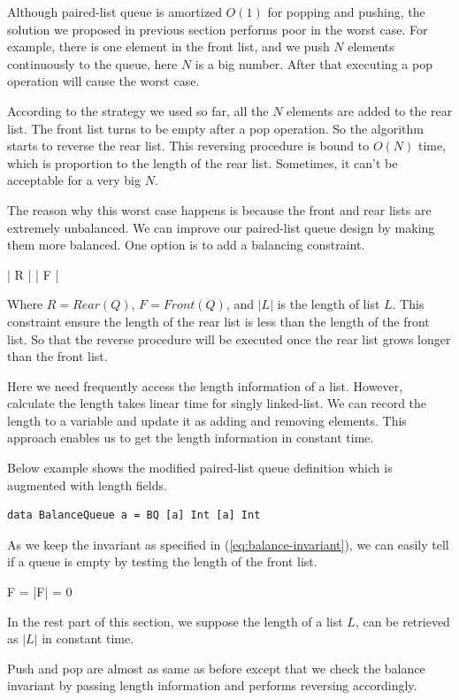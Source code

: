 \documentclass[UTF8]{article}
\begin{document}
Although paired-list queue is amortized $O(1)$ for popping and pushing,
the solution we proposed in previous section performs poor in the worst case.
For example, there is one element in the front list, and we push $N$ elements
continuously to the queue, here $N$ is a big number. After that executing
a pop operation will cause the worst case.

According to the strategy we used so far, all the $N$ elements are added
to the rear list. The front list turns to be empty after a pop operation.
So the algorithm starts to reverse the rear list. This reversing procedure
is bound to $O(N)$ time, which is proportion to the length of the rear
list. Sometimes, it can't be
acceptable for a very big $N$.

The reason why this worst case happens is because the front and rear lists
are extremely unbalanced. We can improve our paired-list queue design
by making them more balanced. One option is to add a balancing constraint.

\be
  | R | \leq | F |
\label{eq:balance-invariant}
\ee

Where $R = Rear(Q)$, $F = Front(Q)$, and $|L|$ is the length of list $L$.
This constraint ensure the length
of the rear list is less than the length of the front list. So that the reverse
procedure will be executed once the rear list grows longer than
the front list.

Here we need frequently access the length information of a list. However,
calculate the length takes linear time for singly linked-list. We can
record the length to a variable and update it as adding and removing elements.
This approach enables us to get the length information in constant time.

Below example shows the modified paired-list queue definition which is augmented
with length fields.

\lstset{language=Haskell}
\begin{lstlisting}
data BalanceQueue a = BQ [a] Int [a] Int
\end{lstlisting}

As we keep the invariant as specified in (\ref{eq:balance-invariant}), we
can easily tell if a queue is empty by testing the length of the front list.

\be
  F = \Phi \Leftrightarrow |F| = 0
\ee

In the rest part of this section, we suppose the length of a list $L$, can
be retrieved as $|L|$ in constant time.

Push and pop are almost as same as before except that we check the balance
invariant by passing length information and performs reversing accordingly.
\end{document}
